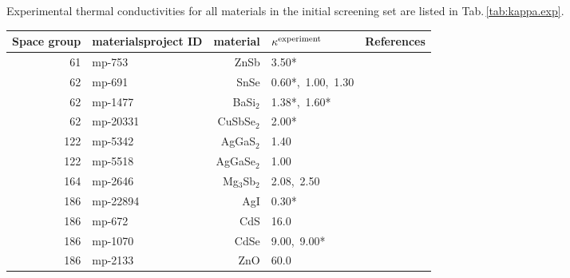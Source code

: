 Experimental thermal conductivities for all materials in the initial screening set are listed in Tab.\,\ref{tab:kappa.exp}.

\begin{table*}[ht]
\small
\begin{center}
\begin{tabular}{rlrll}
\toprule
      Space group &       materialsproject ID &      material &       $\kappa^{\rm experiment}$ & References \\
\midrule
      61 &      mp-753 &          ZnSb &            3.50* &       \cite{Bjerg.2014} \\
      62 &      mp-691 &          SnSe &            0.60*,~1.00,~1.30 &        \cite{Zhao.2014,Sassi.2014,Wei.2016} \\
      62 &     mp-1477 &      BaSi$_2$ &            1.38*,~1.60* &   \cite{Hashimoto.2007,Spitzer.1970} \\
      62 &    mp-20331 &    CuSbSe$_2$ &            2.00* &          \cite{Li.2006} \\
     122 &     mp-5342 &     AgGaS$_2$ &            1.40 &     \cite{Beasley.1994} \\
     122 &     mp-5518 &    AgGaSe$_2$ &            1.00 &     \cite{Beasley.1994} \\
     164 &     mp-2646 &  Mg$_3$Sb$_2$ &            2.08,~2.50 &   \cite{Ahmadpour.2007,Pan.2020} \\
     186 &    mp-22894 &           AgI &            0.30* &       \cite{Goetz.1982} \\
     186 &      mp-672 &           CdS &           16.0 &     \cite{Morelli.2006} \\
     186 &     mp-1070 &          CdSe &            9.00,~9.00* &       \cite{Feser.2013,Slack.1972} \\
     186 &     mp-2133 &           ZnO &            60.0 &     \cite{Morelli.2006} \\    

\end{tabular}
\end{center}
\end{table*}
